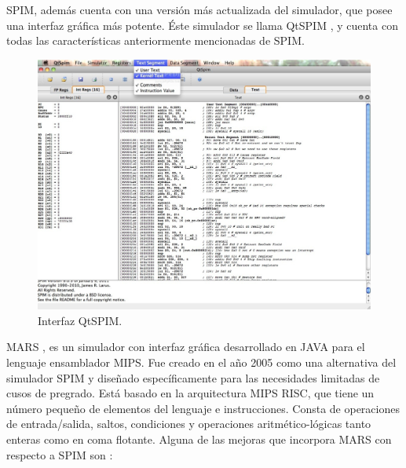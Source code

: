 SPIM, además cuenta con una versión más actualizada del simulador, que posee una interfaz gráfica más potente. Éste simulador se llama QtSPIM \cite{aguilar2013simuladores}, y cuenta con todas las características anteriormente mencionadas de SPIM.

\begin{figure}[htbp]
 	\centering
 	\includegraphics[width=12cm]{figures/qtspim_figure}
 	\caption{Interfaz QtSPIM.}
	\label{fig:qtspim_figure}
\end{figure}

MARS \cite{vollmar2006mars}, es un simulador con interfaz gráfica desarrollado en JAVA para el lenguaje ensamblador MIPS. Fue creado en el año 2005 como una alternativa del simulador SPIM y diseñado específicamente para las necesidades limitadas de cusos de pregrado. Está basado en la arquitectura MIPS RISC, que tiene un número pequeño de elementos del lenguaje e instrucciones. Consta de operaciones de entrada/salida, saltos, condiciones y operaciones aritmético-lógicas tanto enteras como en coma flotante. Alguna de las mejoras que incorpora MARS con respecto a SPIM son \cite{vegdahl2008mipspilot}: 

